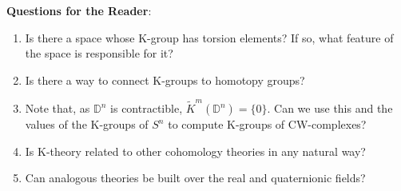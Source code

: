\documentclass[11pt,a4paper]{article}
\begin{document}
\textbf{Questions for the Reader}:
\begin{enumerate}
    \item Is there a space whose K-group has torsion elements? If so, what feature of the space is responsible for it?
    \item Is there a way to connect K-groups to homotopy groups?
    \item Note that, as $\mathbb{D}^n$ is contractible, $\widetilde{K}^m(\mathbb{D}^n)=\{0\}$. Can we use this and the values of the K-groups of $S^n$ to compute K-groups of CW-complexes?
    \item Is K-theory related to other cohomology theories in any natural way?
    \item Can analogous theories be built over the real and quaternionic fields?
\end{enumerate}



\end{document}
